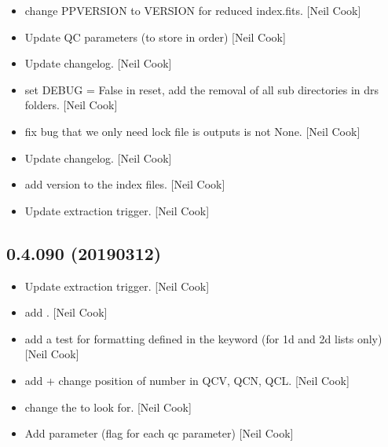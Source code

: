 \documentclass[a4paper,10pt,english]{report}
\begin{document}
\begin{itemize}
\item {} 
 \sphinxhyphen{} change PPVERSION to VERSION for reduced index.fits.
{[}Neil Cook{]}

\item {} 
Update QC parameters (to store in order) {[}Neil Cook{]}

\item {} 
Update changelog. {[}Neil Cook{]}

\item {} 
 \sphinxhyphen{} set DEBUG = False in reset, add the removal of all sub\sphinxhyphen{}
directories in drs folders. {[}Neil Cook{]}

\item {} 
 \sphinxhyphen{} fix bug that we only need lock file is outputs is
not None. {[}Neil Cook{]}

\item {} 
Update changelog. {[}Neil Cook{]}

\item {} 
 \sphinxhyphen{} add version to the index files. {[}Neil Cook{]}

\item {} 
Update extraction trigger. {[}Neil Cook{]}

\end{itemize}


\subsection{0.4.090 (2019\sphinxhyphen{}03\sphinxhyphen{}12)}
\label{\detokenize{misc/changelog:id188}}\begin{itemize}
\item {} 
Update extraction trigger. {[}Neil Cook{]}

\item {} 
 \sphinxhyphen{} add . {[}Neil Cook{]}

\item {} 
 \sphinxhyphen{} add a test for formatting defined in the keyword (for
1d and 2d lists only) {[}Neil Cook{]}

\item {} 
 \sphinxhyphen{} add  + change position of number in
QCV, QCN, QCL. {[}Neil Cook{]}

\item {} 
 \sphinxhyphen{} change the  to look for. {[}Neil Cook{]}

\item {} 
Add  parameter (flag for each qc parameter) {[}Neil Cook{]}

\end{itemize}
\end{document}
